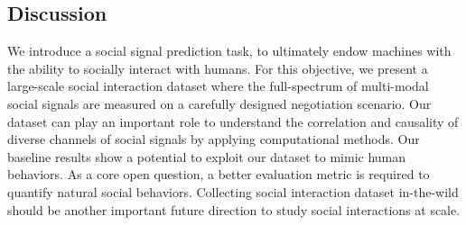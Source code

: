 




\subsection{Discussion}
We introduce a social signal prediction task, to ultimately endow machines with the ability to socially interact with humans. For this objective, we present a large-scale social interaction dataset where the full-spectrum of multi-modal social signals are measured on a carefully designed negotiation scenario. Our dataset can play an important role to understand the correlation and causality of diverse channels of social signals by applying computational methods. Our baseline results show a potential to exploit our dataset to mimic human behaviors. As a core open question, a better evaluation metric is required to quantify natural social behaviors. Collecting social interaction dataset in-the-wild should be another important future direction to study social interactions at scale. %







